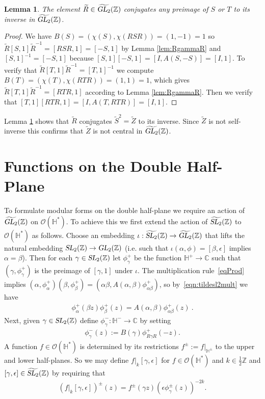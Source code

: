 \documentclass[aps,prd,groupedaddress,preprint,tightenlines,eqsecnum,nofootinbib]{revtex4}
\newcommand{\g}{\gamma}
\newcommand{\e}{\epsilon}
\newcommand{\SL}{\operatorname{\textsl{SL}}}      %
\newcommand{\GL}{\operatorname{\textsl{GL}}}      %
\newcommand{\C}{{\mathbb C}}%
\newcommand{\Z}{{\mathbb Z}}%
\newcommand{\HH}{{\mathbb H}}%
\newcommand{\WT}{\widetilde}
\newcommand{\A}{\alpha}
\newcommand{\B}{\beta}
\newcommand{\OO}{\mathcal{O}}
\newtheorem{lem}[thm]{Lemma}
\begin{document}
\begin{lem}
\label{LemI2}
The element $\WT R\in\widetilde{\GL_2}(\Z)$ conjugates any preimage of $S$ or $T$ to its inverse in $\widetilde{\GL_2}(\Z)$.
\end{lem}
\begin{proof}
We have $B(S)=(\chi(S),\chi(RSR))=(1,-1)=1$ so $\WT R[ S,1]\WT R^{-1}=[RSR,1]=[-S,1]$ by Lemma \ref{lem:RgammaR} and $[ S,1]^{-1}=[-S,1]$ because $[S,1][-S,1]=[I,A(S,-S)]=[I,1]$. To verify that $\WT R [ T,1]\WT R^{-1}=[ T,1]^{-1}$ we compute $B(T)=(\chi(T),\chi(RTR))=(1,1)=1$, which gives $\WT R[ T,1]\WT R^{-1}=[RTR,1]$ according to Lemma \ref{lem:RgammaR}. Then we verify that $[T,1][RTR,1]=[I,A(T,RTR)]=[I,1]$.
\end{proof}
Lemma \ref{LemI2} shows that $\WT R$ conjugates $\WT S^2=\WT Z$ to its inverse. Since $\WT Z$ is not self-inverse this confirms that $\WT Z$ is not central in $\widetilde{\GL_2}(\Z)$.

\section{Functions on the Double Half-Plane}
\label{sec:fnsdblhlfpln}


To formulate modular forms on the double half-plane we require an action of $\widetilde{\GL_2}(\Z)$ on $\OO(\HH^*)$. To achieve this we first extend the action of $\widetilde{\SL_2}(\Z)$ to $\OO(\HH^*)$ as follows. Choose an embedding $\iota:\widetilde{\SL_2}(\Z)\to\widetilde{\GL_2}(\Z)$ that lifts the natural embedding $\SL_2(\Z)\to \GL_2(\Z)$ (i.e. such that $\iota(\A,\phi)=[\B,\e]$ implies $\A=\B$). Then for each $\g\in \SL_2(\Z)$ let $\phi_{\g}^+$ be the function $\HH^+\to\C$ such that $(\g,\phi_{\g}^+)$ is the preimage of $[\g,1]$ under $\iota$. The multiplication rule~\eqref{eqProd} implies $(\A,\phi^+_{\A})(\B,\phi^+_{\B})=(\A\B,A(\A,\B)\phi^+_{\A\B})$, so by~\eqref{eqn:tildesl2mult} we have
\begin{align}
\label{eqP1}
	\phi^+_\A(\B z)\phi^+_{\B}(z) = A(\A,\B)\phi^+_{\A\B}(z)~.
\end{align}
Next, given $\g\in \SL_2(\Z)$ define $\phi_{\g}^-:\HH^-\to \C$ by setting
\begin{align}
\label{eqP2}
	\phi_{\g}^-(z):=B(\g) \phi_{R\g R}^+(-z).
\end{align}
A function $f\in \mathcal{O}(\HH^*)$ is determined by its restrictions $f^\pm:=f|_{\HH^\pm}$ to the upper and lower half-planes. So we may define $f|_k[\gamma,\e]$ for $f\in\mathcal{O}(\HH^*)$ and $k\in \frac12\Z$ and $[\g,\e]\in \widetilde{\SL_2}(\Z)$ by requiring that
\begin{gather}\label{eqn:actionoftildesl2}
	(f|_k[\gamma,\e])^\pm(z)=f^\pm(\gamma z)(\e\phi_\gamma^\pm(z))^{-2k}.
\end{gather}
\end{document}
